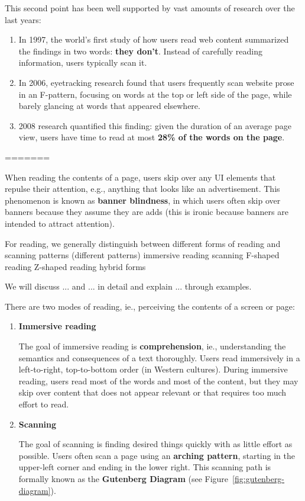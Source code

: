 This second point has been well supported by vast amounts of research over the last years:
\begin{enumerate}
	\item In 1997, the world's first study of how users read web content summarized the findings in two words: \textbf{they don't}. Instead of carefully reading information, users typically scan it.
	\item In 2006, eyetracking research found that users frequently scan website prose in an F-pattern, focusing on words at the top or left side of the page, while barely glancing at words that appeared elsewhere.
	\item 2008 research quantified this finding: given the duration of an average page view, users have time to read at most \textbf{28\% of the words on the page}.
\end{enumerate}

=======

When reading the contents of a page, users skip over any UI elements that repulse their attention, e.g., anything that looks like an advertisement. This phenomenon is known as \textbf{banner blindness}, in which users often skip over banners because they assume they are adds (this is ironic because banners are intended to attract attention).



For reading, we generally distinguish between different forms of reading and scanning patterns (different patterns)
immersive reading
scanning
F-shaped reading
Z-shaped reading
hybrid forms

We will discuss ... and ... in detail and explain ... through examples.

There are two modes of reading, ie., perceiving the contents of a screen or page:
\begin{enumerate}
	\item \textbf{Immersive reading} \par The goal of immersive reading is \textbf{comprehension}, ie., understanding the semantics and consequences of a text thoroughly.
	Users read immersively in a left-to-right, top-to-bottom order (in Western cultures).
	During immersive reading, users read most of the words and most of the content, but they may skip over content that does not appear relevant or that requires too much effort to read.
	
	\item \textbf{Scanning} \par The goal of scanning is finding desired things quickly with as little effort as possible.
	Users often scan a page using an \textbf{arching pattern}, starting in the upper-left corner and ending in the lower right.
	This scanning path is formally known as the \textbf{Gutenberg Diagram} (see Figure~\ref{fig:gutenberg-diagram}).
	
\end{enumerate}

